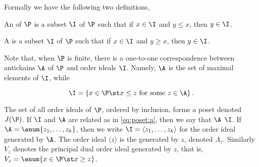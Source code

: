 Formally we have the following two definitions,
\begin{definition}
An  of $\P$ is a subset $\I$ of $\P$ such that if $x \in
\I$ and $y \le x$, then $y \in \I$.
\end{definition}
\begin{definition}
A  is a subset $\I$ of $\P$ such that if $x \in \I$
and $y \ge x$, then $y \in \I$.
\end{definition}

Note that, when $\P$ is finite, there is a one-to-one correspondence between
antichains $\A$ of $\P$ and order ideals $\I$. Namely, $\A$ is the set of maximal
elements of $\I$, while

\begin{equation}
\label{eq:poset:a}
\I = \left\{{x \in \P \st x \le z ~\text{for some}~ z \in \A}\right\}.
\end{equation}

The set of all order ideals of $\P$, ordered by inclusion, forms a poset denoted
$J(\P)$. If $\I$ and $\A$ are related as in \ref{eq:poset:a}, then we say that $\A$
 $\I$. If $\A = \enum{z_1 , \ldots , z_k}$, then we
write $\I = \langle z_1 , \ldots , z_k \rangle$ for the order ideal generated by
$\A$. The order ideal $\langle z \rangle$ is the 
generated by $z$, denoted $\Lambda_z$. Similarly $V_z$ denotes the principal
dual order ideal generated by $z$, that is, $V_z = \enum{x \in \P \st x \ge
z}$.

